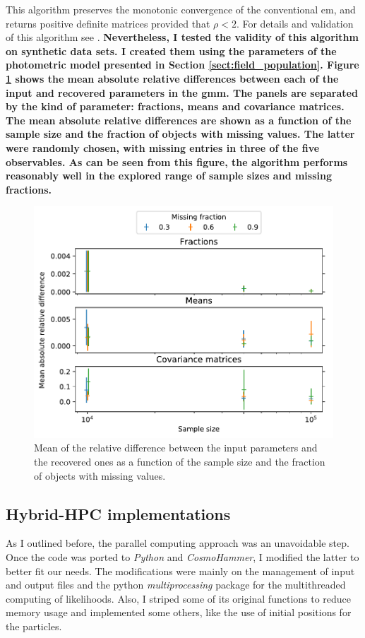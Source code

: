  This algorithm preserves the monotonic convergence of the conventional \gls{em}, and returns positive definite matrices provided that $\rho < 2$. For details and validation of this algorithm see \citet{McMichael1996}. \textbf{Nevertheless, I tested the validity of this algorithm on synthetic data sets. I created them using the parameters of the photometric model presented in Section \ref{sect:field_population}.  Figure \ref{fig:validate_MGMM} shows the mean absolute relative differences between each of the input and recovered parameters in the \gls{gmm}. The panels are separated by the kind of parameter: fractions, means and covariance matrices. The mean absolute relative differences are shown as a function of the sample size and the fraction of objects with missing values. The latter were randomly chosen, with missing entries in three of the five observables. As can be seen from this figure, the algorithm performs reasonably well in the explored range of sample sizes and missing fractions.}
 
 \begin{figure}[H]
    \centering
        \includegraphics[width=\textwidth]{background/Figures/Analysis_Missing_GMM.pdf}
\caption{Mean of the relative difference between the input parameters and the recovered ones as a function of the sample size and the fraction of objects with missing values.}
\label{fig:validate_MGMM}
\end{figure}


\subsection{Hybrid-HPC implementations}
\label{sect:HHPC}
As I outlined before, the parallel computing approach was an unavoidable step. Once the code was ported to \emph{Python} and \emph{CosmoHammer}, I modified the latter to better fit our needs. The modifications were mainly on the management of input and output files and the python \emph{multiprocessing} package for the multithreaded computing of likelihoods. Also, I striped some of its original functions to reduce memory usage and implemented some others, like the use of initial positions for the particles.

